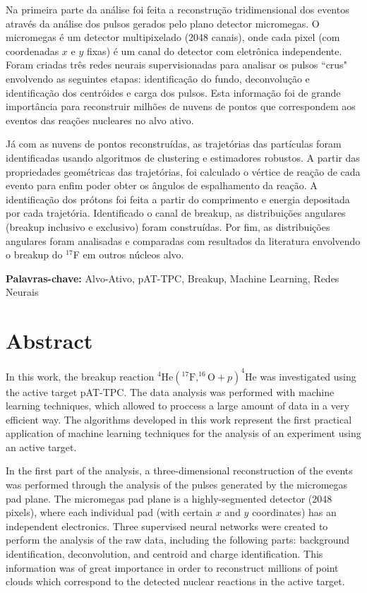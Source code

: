\documentclass[a4paper,12pt,oneside]{book}
\begin{document}
\par Na primeira parte da análise foi feita a reconstrução tridimensional dos eventos através da análise dos pulsos gerados pelo plano detector micromegas. O micromegas é um detector multipixelado (2048 canais), onde cada pixel (com coordenadas $x$ e $y$ fixas) é um canal do detector com eletrônica independente. Foram criadas três redes neurais supervisionadas para analisar os pulsos ``crus" envolvendo as seguintes etapas: identificação do fundo, deconvolução e identificação dos centróides e carga dos pulsos. Esta informação foi de grande importância para reconstruir milhões de nuvens de pontos que correspondem aos eventos das reações nucleares no alvo ativo.

\par Já com as nuvens de pontos reconstruídas, as trajetórias das partículas foram identificadas usando algoritmos de clustering e estimadores robustos. A partir das propriedades geométricas das trajetórias, foi calculado o vértice de reação de cada evento para enfim poder obter os ângulos de espalhamento da reação. A identificação dos prótons foi feita a partir do comprimento e energia depositada por cada trajetória. Identificado o canal de breakup, as distribuições angulares (breakup inclusivo e exclusivo) foram construídas. Por fim, as distribuições angulares foram analisadas e comparadas com resultados da literatura envolvendo o breakup do $^{17}$F em outros núcleos alvo.
\par \textbf{Palavras-chave:} Alvo-Ativo, pAT-TPC, Breakup, Machine Learning, Redes Neurais
 

\chapter*{Abstract}
\thispagestyle{empty}
\par In this work, the breakup reaction $^4\mathrm{He}(^{17}\mathrm{F},^{16}\mathrm{O}+p)^4\mathrm{He}$ was investigated using the active target pAT-TPC. The data analysis was performed with machine learning techniques, which allowed to proccess a large amount of data in a very efficient way. The algorithms developed in this work represent the first practical application of machine learning techniques for the analysis of an experiment using an active target.

\par In the first part of the analysis, a three-dimensional reconstruction of the events was performed through the analysis of the pulses generated by the micromegas pad plane. The micromegas pad plane is a highly-segmented detector (2048 pixels), where each individual pad (with certain $x$ and $y$ coordinates) has an independent electronics. Three supervised neural networks were created to perform the analysis of the raw data, including the following parts: background identification, deconvolution, and centroid and charge identification. This information was of great importance in order to reconstruct millions of point clouds which correspond to the detected nuclear reactions in the active target.
\end{document}
